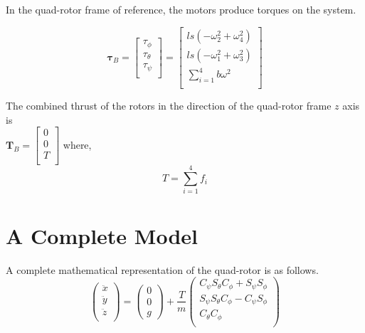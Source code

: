 In the quad-rotor frame of reference, the motors produce torques on the system.

\begin{equation}
    \label{taub}
    \boldsymbol \tau_B = \left[ \begin{array}{c} \tau_{\phi}\\\tau_{\theta}\\\tau_{\psi}\\ \end{array} \right] = \left[ \begin{array}{c} l s (-\omega_2^2 + \omega_4^2)\\l s (-\omega_1^2 + \omega_3^2)\\ \displaystyle \sum \limits_{i=1}^4 b \omega^2\\\end{array} \right]
\end{equation}

The combined thrust of the rotors in the direction of the quad-rotor frame $z$ axis is\\

$\boldsymbol T_B = \left[ \begin{array}{c} 0\\0\\T\\ \end{array} \right]$ where,\\

\begin{equation}
    \label{totalThrust}
    T =  \displaystyle \sum \limits_{i=1}^4 f_i
\end{equation}



\section {A Complete Model}


A complete mathematical representation of the quad-rotor is as follows.\\ 

\begin{equation}
    \left(
        \begin{array}{c}
           \ddot{x}\\
           \ddot{y}\\
           \ddot{z}\\
        \end{array}
    \right)
    = \left(
       \begin{array}{c}
        0\\
        0\\
        g  
      \end{array}
    \right)
    +\frac{T}{m}
     \left(
        \begin{array}{c}
             C_{\psi}S_{\theta}C_{\phi} + S_{\psi}S_{\phi} \\
             S_{\psi}S_{\theta}C_{\phi} - C_{\psi}S_{\phi} \\
             C_{\theta} C_{\phi} \\
        \end{array}
    \right)
\end{equation}

